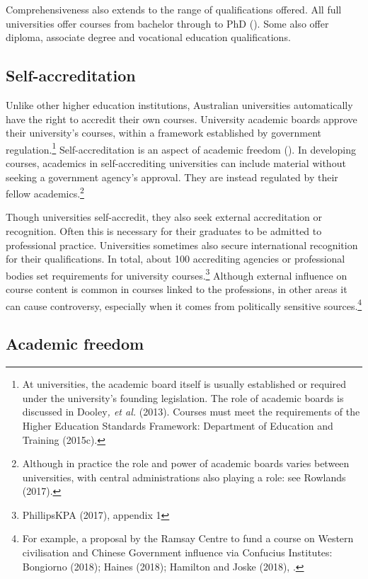 \documentclass{grattan}
\begin{document}
Comprehensiveness also extends to the range of qualifications offered. All full universities offer courses from bachelor through to PhD (). Some also offer diploma, associate degree and vocational education qualifications.

%
\subsection{Self-accreditation}\label{subsec:self-accreditation}

Unlike other higher education institutions, Australian universities automatically have the right to accredit their own courses. University academic boards approve their university's courses, within a framework established by government regulation.\footnote{At universities, the academic board itself is usually established or required under the university's founding legislation. The role of academic boards is discussed in Dooley\emph{, et al.} (2013). Courses must meet the requirements of the Higher Education Standards Framework: Department of Education and Training (2015c).} Self-accreditation is an aspect of academic freedom (). In developing courses, academics in self-accrediting universities can include material without seeking a government agency's approval. They are instead regulated by their fellow academics.\footnote{Although in practice the role and power of academic boards varies between universities, with central administrations also playing a role: see Rowlands (2017).}

Though universities self-accredit, they also seek external accreditation or recognition. Often this is necessary for their graduates to be admitted to professional practice. Universities sometimes also secure international recognition for their qualifications. In total, about 100 accrediting agencies or professional bodies set requirements for university courses.\footnote{PhillipsKPA (2017), appendix 1} Although external influence on course content is common in courses linked to the professions, in other areas it can cause controversy, especially when it comes from politically sensitive sources.\footnote{For example, a proposal by the Ramsay Centre to fund a course on Western civilisation and Chinese Government influence via Confucius Institutes: Bongiorno (2018); Haines (2018); Hamilton and Joske (2018), .}

%
\subsection{Academic freedom}\label{subsec:academic-freedom}
\end{document}
